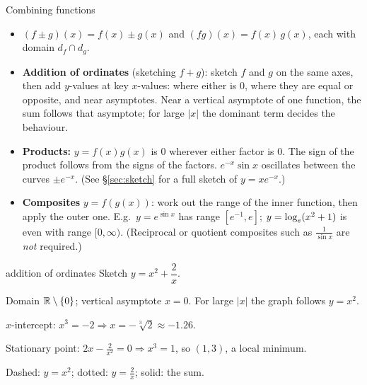 \begin{keyres}{Combining functions}
\begin{itemize}
  \item $(f\pm g)(x)=f(x)\pm g(x)$ and $(fg)(x)=f(x)\,g(x)$, each with domain $d_f\cap d_g$.
  \item \textbf{Addition of ordinates} (sketching $f+g$): sketch $f$ and $g$ on the same axes, then add $y$-values at key $x$-values: where either is $0$, where they are equal or opposite, and near asymptotes. Near a vertical asymptote of one function, the sum follows that asymptote; for large $|x|$ the dominant term decides the behaviour.
  \item \textbf{Products:} $y=f(x)g(x)$ is $0$ wherever either factor is $0$. The sign of the product follows from the signs of the factors. $e^{-x}\sin x$ oscillates between the curves $\pm e^{-x}$. (See \S\ref{sec:sketch} for a full sketch of $y=xe^{-x}$.)
  \item \textbf{Composites} $y=f(g(x))$: work out the range of the inner function, then apply the outer one. E.g.\ $y=e^{\sin x}$ has range $\left[e^{-1},e\right]$; $y=\log_e(x^2+1)$ is even with range $[0,\infty)$. (Reciprocal or quotient composites such as $\frac{1}{\sin x}$ are \emph{not} required.)
\end{itemize}
\end{keyres}

\begin{cols}
\begin{example}{addition of ordinates \byhand}
Sketch $y=x^2+\dfrac{2}{x}$.\par
Domain $\mathbb{R}\setminus\{0\}$; vertical asymptote $x=0$. For large $|x|$ the graph follows $y=x^2$.\par
$x$-intercept: $x^3=-2\Rightarrow x=-\sqrt[3]{2}\approx-1.26$.\par
Stationary point: $2x-\frac{2}{x^2}=0\Rightarrow x^3=1$, so $(1,3)$, a local minimum.
\end{example}
\nextcol
\centering
{}

{\scriptsize Dashed: $y=x^2$; dotted: $y=\frac2x$; solid: the sum.}
\end{cols}

